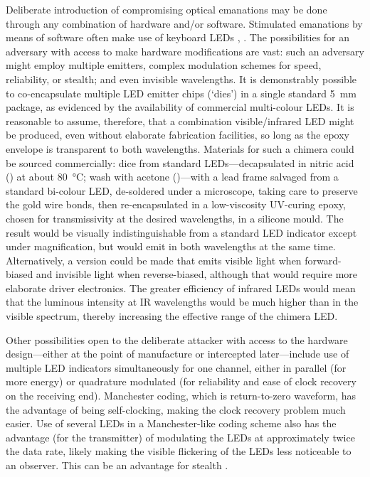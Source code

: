 \documentclass[a4paper,twoside,11pt,openany]{book}
\begin{document}
Deliberate introduction of compromising optical emanations may be done through
any combination of hardware and/or software. Stimulated emanations by means of
software often make use of keyboard LEDs \cite[Appendix A]{Loughry2002a},
\cite{Zhou2018c}. The possibilities for an adversary
with access to make hardware modifications are vast: such an adversary might
employ multiple emitters, complex modulation schemes for speed, reliability, or
stealth; and even invisible wavelengths. It is demonstrably possible to
co-encapsulate multiple LED emitter chips (`dies') in a single standard
\SI{5}{\milli\metre} package, as evidenced by the availability of commercial
multi-colour LEDs. It is reasonable to assume, therefore, that a combination
visible/infrared LED might be produced, even without elaborate fabrication
facilities, so long as the epoxy envelope is transparent to both wavelengths.
Materials for such a chimera could be sourced commercially: dice from standard
LEDs---decapsulated in nitric acid () at about \SI{80}{\celsius}; wash
with acetone ()---with a lead frame salvaged from a standard
bi-colour LED,
de-soldered under a microscope, taking care to preserve the gold wire bonds,
then re-encapsulated in a low-viscosity UV-curing epoxy, chosen for
transmissivity at the desired wavelengths, in a silicone mould. The result
would be visually indistinguishable from a standard LED indicator except under
magnification, but would emit in both wavelengths at the same time.
Alternatively, a version could be made that emits visible light when
forward-biased and invisible light when reverse-biased, although that would
require more elaborate driver electronics. The greater efficiency of infrared
LEDs would mean that the luminous intensity at IR wavelengths would be much
higher than in the visible spectrum, thereby increasing the effective range of
the chimera LED.

Other possibilities open to the deliberate attacker with access to the hardware
design---either at the point of manufacture or intercepted later---include use
of multiple LED indicators simultaneously for one channel, either in parallel
(for more energy) or quadrature modulated (for reliability and ease of clock
recovery on the receiving end). Manchester coding, which is return-to-zero
waveform, has the advantage of being self-clocking, making the clock recovery
problem much easier. Use of several LEDs in a Manchester-like coding scheme
also has the advantage (for the transmitter) of modulating the LEDs at
approximately twice the data rate, likely making the visible flickering of the
LEDs less noticeable to an observer. This can be an advantage for stealth
\cite{Zhou2018c}.
\end{document}
